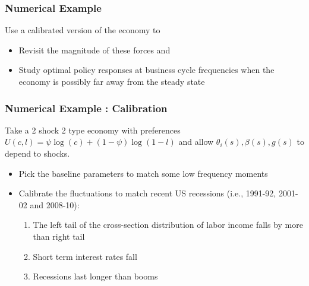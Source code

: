 \documentclass{beamer}
\begin{document}
\begin{frame}
 \frametitle{Numerical Example}

 Use a  calibrated version of the economy to 
 \begin{itemize}
  \item Revisit the magnitude of these forces and 
  \item Study optimal policy responses at business cycle frequencies when the economy is possibly far away from the steady state
 \end{itemize}
 \end{frame}
 \begin{frame}
 \frametitle{Numerical Example : Calibration}
Take a 2 shock 2 type economy with preferences $U(c,l)=\psi \log(c)+(1-\psi)\log(1-l)$ and allow $\theta_i(s),\beta(s),g(s)$ to depend to shocks.

 \begin{itemize}
 
 \item Pick the baseline parameters to match some low frequency moments

 \item Calibrate the fluctuations to match recent US recessions (i.e., 1991-92, 2001-02 and 2008-10):

 \begin{enumerate}
  \item The left tail of the cross-section distribution of labor income falls by more than right tail
  \item Short term interest rates fall
  \item Recessions last longer than booms
 \end{enumerate}

 \end{itemize}

\end{frame}
\end{document}
